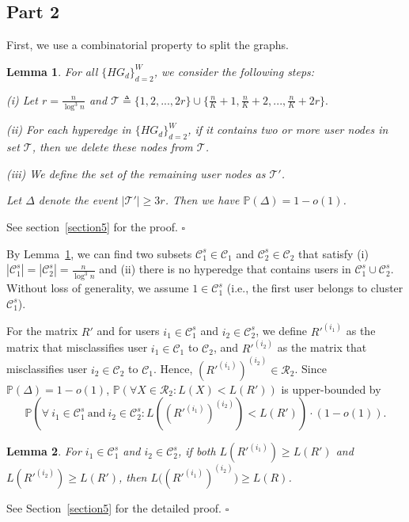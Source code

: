 \documentclass{article}
\newtheorem{lemma}{Lemma}
\newcommand\HG{\{ HG_d \}_{d=2}^W}
\newenvironment{proof}{{\noindent\it Proof:}\quad}{\hfill $\square$\par}
\begin{document}
\subsection{Part 2}\label{part2}
First, we use a combinatorial property to split the graphs.

\begin{lemma}\label{lemma8}
	For all $\HG$, we consider the following steps:
	
	(i) Let $r=\frac{n}{\log^3 n}$ and $\mathcal{T} \triangleq \{ 1, 2, ..., 2r \} \cup \{ \frac{n}{K}+1, \frac{n}{K}+2,..., \frac{n}{K}+2r \}. $ 
	
	(ii) For each hyperedge in $\HG$, if it contains two or more user nodes in set $\mathcal{T}$, then we delete these nodes  from $\mathcal{T}$.    
	
	(iii) We define the set of the remaining user nodes as $\mathcal{T}'$.
	
	Let $\Delta$ denote the event $|\mathcal{T}'| \geq 3r$. Then we have $\mathbb{P} (\Delta) = 1-o(1)$.
\end{lemma}

\begin{proof}
    See section~\ref{section5} for the proof.
\end{proof}
By Lemma~\ref{lemma8}, we can find two subsets $\mathcal{C}_1^s \in \mathcal{C}_1$ and $\mathcal{C}_2^s \in \mathcal{C}_2$ that satisfy (i) $|\mathcal{C}_1^s|=|\mathcal{C}_2^s|=\frac{n}{\log^3 n}$ and (ii) there is no hyperedge that contains users in $\mathcal{C}_1^s \cup \mathcal{C}_2^s$. Without loss of generality, we assume $1 \in \mathcal{C}_1^s$ (i.e., the first user belongs to cluster $\mathcal{C}_1^s$).

For the matrix $R'$ and for users $i_1 \in \mathcal{C}^s_1$ and $i_2 \in \mathcal{C}^s_2$, we define $R'^{(i_1)}$ as the matrix that misclassifies user $i_1 \in \mathcal{C}_1$ to $\mathcal{C}_2$, and $R'^{(i_2)}$ as the matrix that misclassifies user $i_2 \in \mathcal{C}_2$ to $\mathcal{C}_1$. Hence, $(R'^{(i_1)})^{(i_2)} \in \mathcal{R}_2$. Since $\mathbb{P}\left( \Delta \right)=1-o(1)$, $\mathbb{P} (\forall X \in \mathcal{R}_2: L(X)<L(R'))$ is upper-bounded by
\begin{equation}\label{S42_1}
        \mathbb{P} \left( \forall \  i_1 \in \mathcal{C}_1^s \mathrm{ \ and \ } i_2 \in \mathcal{C}_2^s:  L\left( \left( R'^{(i_1)} \right)^{(i_2)} \right) < L(R') \right) \cdot (1-o(1)).
\end{equation}

\begin{lemma}\label{lemma9}
	For $i_1 \in \mathcal{C}_1^s$ and $i_2 \in \mathcal{C}_2^s$, if both $L\left( R'^{(i_1)}\right) \geq L(R') $ and $L\left( R'^{(i_2)} \right) \geq L(R')$, then $L\Big( \left( R'^{(i_1)} \right)^{(i_2)} \Big) \geq L(R)$.
\end{lemma}
\begin{proof}
    See Section~\ref{section5} for the detailed proof.
\end{proof}
\end{document}
